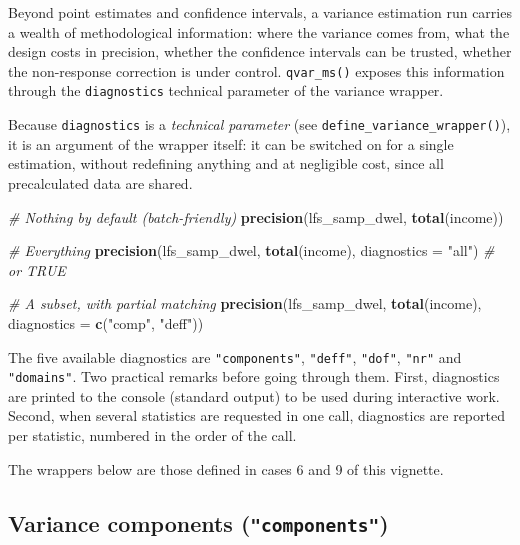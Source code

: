 \documentclass[
]{article}
\newenvironment{Shaded}{\begin{snugshade}}{\end{snugshade}}
\newcommand{\AttributeTok}[1]{\textcolor[rgb]{0.13,0.29,0.53}{#1}}
\newcommand{\CommentTok}[1]{\textcolor[rgb]{0.56,0.35,0.01}{\textit{#1}}}
\newcommand{\FunctionTok}[1]{\textcolor[rgb]{0.13,0.29,0.53}{\textbf{#1}}}
\newcommand{\NormalTok}[1]{#1}
\newcommand{\StringTok}[1]{\textcolor[rgb]{0.31,0.60,0.02}{#1}}
\begin{document}
Beyond point estimates and confidence intervals, a variance estimation
run carries a wealth of methodological information: where the variance
comes from, what the design costs in precision, whether the confidence
intervals can be trusted, whether the non-response correction is under
control. \texttt{qvar\_ms()} exposes this information through the
\texttt{diagnostics} technical parameter of the variance wrapper.

Because \texttt{diagnostics} is a \emph{technical parameter} (see
\texttt{define\_variance\_wrapper()}), it is an argument of the wrapper
itself: it can be switched on for a single estimation, without
redefining anything and at negligible cost, since all precalculated data
are shared.

\begin{Shaded}
\begin{Highlighting}[]
\CommentTok{\# Nothing by default (batch{-}friendly)}
\FunctionTok{precision}\NormalTok{(lfs\_samp\_dwel, }\FunctionTok{total}\NormalTok{(income))}

\CommentTok{\# Everything}
\FunctionTok{precision}\NormalTok{(lfs\_samp\_dwel, }\FunctionTok{total}\NormalTok{(income), }\AttributeTok{diagnostics =} \StringTok{"all"}\NormalTok{)   }\CommentTok{\# or TRUE}

\CommentTok{\# A subset, with partial matching}
\FunctionTok{precision}\NormalTok{(lfs\_samp\_dwel, }\FunctionTok{total}\NormalTok{(income), }\AttributeTok{diagnostics =} \FunctionTok{c}\NormalTok{(}\StringTok{"comp"}\NormalTok{, }\StringTok{"deff"}\NormalTok{))}
\end{Highlighting}
\end{Shaded}

The five available diagnostics are \texttt{"components"},
\texttt{"deff"}, \texttt{"dof"}, \texttt{"nr"} and \texttt{"domains"}.
Two practical remarks before going through them. First, diagnostics are
printed to the console (standard output) to be used during interactive
work. Second, when several statistics are requested in one call,
diagnostics are reported per statistic, numbered in the order of the
call.

The wrappers below are those defined in cases 6 and 9 of this vignette.

\subsection{\texorpdfstring{Variance components
(\texttt{"components"})}{Variance components ("components")}}\label{variance-components-components}
\end{document}
